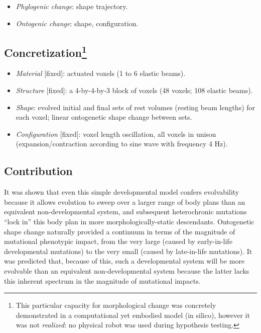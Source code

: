 \begin{itemize}
    \item \textit{Phylogenic change}: shape trajectory.
    \item \textit{Ontogenic change}: shape, configuration.
\end{itemize}


\subsection[Concretization]{Concretization\footnote{This particular capacity for morphological change was concretely demonstrated in a computational yet embodied model (in silico), however it was not \textit{realized}: no physical robot was used during hypothesis testing.}}

\begin{itemize}
    \item \textit{Material} [fixed]: actuated voxels (1 to 6 elastic beams).
    \item \textit{Structure} [fixed]: a 4-by-4-by-3 block of voxels (48 voxels; 108 elastic beams).
    \item \textit{Shape}: evolved initial and final sets of rest volumes (resting beam lengths) for each voxel; linear ontogenetic shape change between sets.
    \item \textit{Configuration} [fixed]: voxel length oscillation, all voxels in unison (expansion/contraction according to sine wave with frequency 4 Hz).
\end{itemize}


\subsection{Contribution}


It was shown that even this simple developmental model confers evolvability 
because it allows evolution to sweep over a larger range of body plans than an equivalent non-developmental system, and subsequent heterochronic mutations
``lock in'' this body plan in more morphologically-static descendants.
Ontogenetic shape change
naturally provided
a continuum in terms of the magnitude of mutational phenotypic impact,
from the very large (caused by early-in-life developmental mutations) 
to the very small (caused by late-in-life mutations). 
It was predicted that,
because of this, such a developmental system will be more evolvable than an equivalent non-developmental system because the latter lacks this inherent spectrum in the magnitude of mutational impacts.

